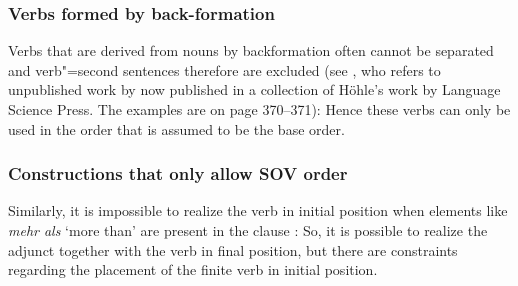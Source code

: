 \subsubsection{Verbs formed by back-formation}

Verbs that are derived from nouns by backformation often cannot be separated and verb"=second
sentences therefore are excluded (see \citealt[]{Haider93a}, who refers to unpublished work
by \citealt{Hoehle91b} now published in a collection of Höhle's work by Language Science Press. The
examples are on page 370--371):
\eal
{}
\zl
Hence these verbs can only be used in the order that is assumed to be the base order.

\subsubsection{Constructions that only allow SOV order}

Similarly, it is impossible to realize the verb in initial position when elements like
\emph{mehr als} `more than' are present in the clause \parencites[Section~3.1]{Haider97c}[]{Meinunger2001a}: 
\eal
{}
\zl
So, it is possible to realize the adjunct together with the verb in final position, but there are
constraints regarding the placement of the finite verb in initial position.


